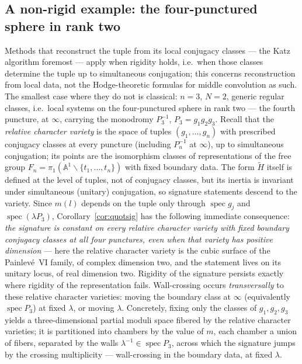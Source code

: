 \documentclass[11pt]{article}
\theoremstyle{definition}
\newcommand{\Ht}{\widetilde H}
\begin{document}
\subsection{A non-rigid example: the four-punctured sphere in rank
two}\label{subsec:nonrigid}

Methods that reconstruct the tuple from its local conjugacy classes
--- the Katz algorithm foremost --- apply when rigidity holds, i.e.\
when those classes determine the tuple up to simultaneous
conjugation; this concerns reconstruction from local data, not the
Hodge-theoretic formulas for middle convolution as such. The smallest case where they do not is
classical: $n=3$, $N=2$, generic regular classes, i.e.\ local systems
on the four-punctured sphere in rank two --- the fourth puncture, at
$\infty$, carrying the monodromy $P_3^{-1}$, $P_3=g_1g_2g_3$.
Recall that the \emph{relative character variety} is the space of
tuples $(g_1,\dots,g_n)$ with prescribed conjugacy classes at every
puncture (including $P_n^{-1}$ at $\infty$), up to simultaneous
conjugation; its points are the isomorphism classes of
representations of the free group
$F_n=\pi_1(\mathbb A^1\smallsetminus\{t_1,\dots,t_n\})$ with
fixed boundary data. The form $\Ht$ itself is defined at the level
of tuples, not of conjugacy classes, but its inertia is invariant
under simultaneous (unitary) conjugation, so signature statements
descend to the variety. Since
$m(l)$ depends on the tuple only through $\operatorname{spec}g_j$ and
$\operatorname{spec}(\lambda P_3)$, Corollary~\ref{cor:quotsig} has
the following immediate consequence: \emph{the signature is constant
on every relative character variety with fixed boundary conjugacy
classes at all four punctures, even when that variety has positive
dimension} --- here the relative character variety is the cubic
surface of the Painlev\'e~VI family, of complex dimension two, and
the statement lives on its unitary locus, of real dimension two. Rigidity of the signature persists exactly
where rigidity of the representation fails. Wall-crossing occurs
\emph{transversally} to these relative character varieties: moving
the boundary class at $\infty$ (equivalently
$\operatorname{spec}P_3$) at fixed $\lambda$, or moving $\lambda$.
Concretely, fixing only the classes of $g_1,g_2,g_3$ yields a
three-dimensional partial moduli space fibered by the relative
character varieties; it is partitioned into chambers by the value of
$m$, each chamber a union of fibers, separated by the walls
$\lambda^{-1}\in\operatorname{spec}P_3$, across which the signature
jumps by the crossing multiplicity --- wall-crossing in the boundary
data, at fixed $\lambda$.
\end{document}
